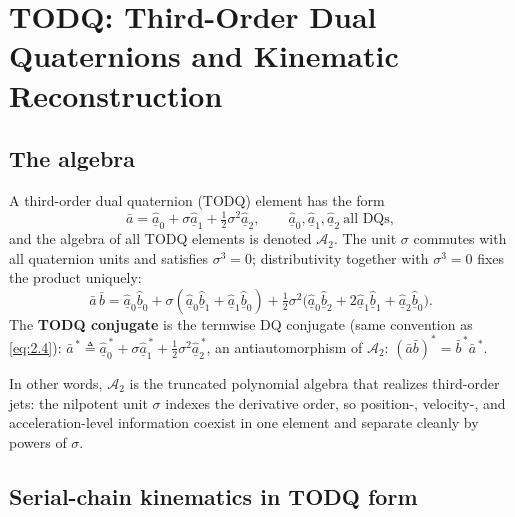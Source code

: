 \section{TODQ: Third-Order Dual Quaternions and Kinematic Reconstruction}

\subsection{The algebra}

\begin{definition}\label{def:todq}
A third-order dual quaternion (TODQ) element has the form
\begin{equation}
\bar a=\hat{\underline a}_0+\sigma\hat{\underline a}_1+\tfrac12\sigma^2\hat{\underline a}_2,\qquad \hat{\underline a}_0,\hat{\underline a}_1,\hat{\underline a}_2\ \text{all DQs},
\tag{3.1}\label{eq:3.1}
\end{equation}
and the algebra of all TODQ elements is denoted $\mathcal A_2$. The unit $\sigma$ commutes with all quaternion units and satisfies $\sigma^3=0$; distributivity together with $\sigma^3=0$ fixes the product uniquely:
\begin{equation}
\bar a\,\bar b=\hat{\underline a}_0\hat{\underline b}_0+\sigma(\hat{\underline a}_0\hat{\underline b}_1+\hat{\underline a}_1\hat{\underline b}_0)+\tfrac12\sigma^2\bigl(\hat{\underline a}_0\hat{\underline b}_2+2\hat{\underline a}_1\hat{\underline b}_1+\hat{\underline a}_2\hat{\underline b}_0\bigr).
\tag{3.2}\label{eq:3.2}
\end{equation}
The \textbf{TODQ conjugate} is the termwise DQ conjugate (same convention as \eqref{eq:2.4}): $\bar a^{\,*}\triangleq\hat{\underline a}_0^{\,*}+\sigma\hat{\underline a}_1^{\,*}+\tfrac12\sigma^2\hat{\underline a}_2^{\,*}$, an antiautomorphism of $\mathcal A_2$: $(\bar a\bar b)^*=\bar b^{\,*}\bar a^{\,*}$.
\end{definition}

In other words, $\mathcal A_2$ is the truncated polynomial algebra that realizes third-order jets: the nilpotent unit $\sigma$ indexes the derivative order, so position-, velocity-, and acceleration-level information coexist in one element and separate cleanly by powers of $\sigma$.

\subsection{Serial-chain kinematics in TODQ form}

